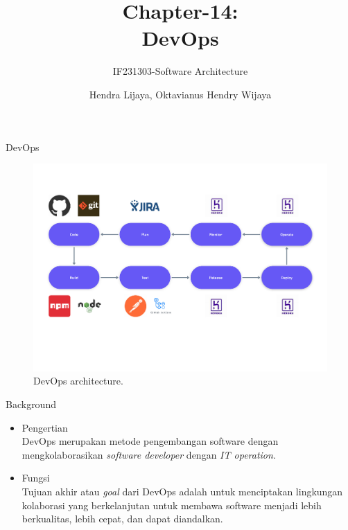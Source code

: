 \documentclass[aspectratio=169, table]{beamer}
\title{\huge Chapter-14:\\DevOps}
\subtitle{IF231303-Software Architecture}
\author{Hendra Lijaya, Oktavianus Hendry Wijaya}
\begin{document}
	\begin{frame}[plain]
		\maketitle
	\end{frame}

	\begin{frame}{DevOps}
		\begin{figure}[h]
			\centering
			\includegraphics[width=\textwidth]{Arsitektur DevOps}
			\caption{DevOps architecture.}
			\label{fig:DevOps}
		\end{figure}
	\end{frame}

	\begin{frame}{Background}
		\begin{itemize}
			\item Pengertian
			\\DevOps merupakan metode pengembangan software dengan mengkolaborasikan \textit{software developer} dengan \textit{IT operation}.
			\item Fungsi
			\\Tujuan akhir atau \textit{goal} dari DevOps adalah untuk menciptakan lingkungan kolaborasi yang berkelanjutan untuk membawa software menjadi lebih berkualitas, lebih cepat, dan dapat diandalkan.
		\end{itemize}
	\end{frame}
\end{document}
